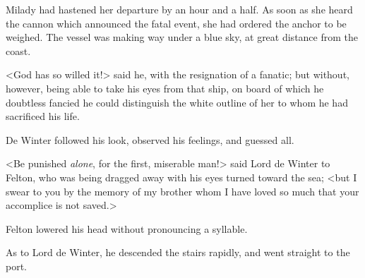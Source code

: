 Milady had hastened her departure by an hour and a half. As soon as she heard the cannon which announced the fatal event, she had ordered the anchor to be weighed. The vessel was making way under a blue sky, at great distance from the coast. 

<God has so willed it!> said he, with the resignation of a fanatic; but without, however, being able to take his eyes from that ship, on board of which he doubtless fancied he could distinguish the white outline of her to whom he had sacrificed his life. 

De Winter followed his look, observed his feelings, and guessed all. 

<Be punished \textit{alone}, for the first, miserable man!> said Lord de Winter to Felton, who was being dragged away with his eyes turned toward the sea; <but I swear to you by the memory of my brother whom I have loved so much that your accomplice is not saved.> 

Felton lowered his head without pronouncing a syllable. 

As to Lord de Winter, he descended the stairs rapidly, and went straight to the port. 